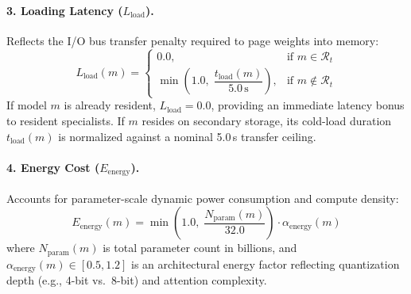 \paragraph{3. Loading Latency ($L_{\text{load}}$).}
Reflects the I/O bus transfer penalty required to page weights into memory:
\begin{equation}
L_{\text{load}}(m) = \begin{cases}
0.0, & \text{if } m \in \mathcal{R}_t \\
\min\left(1.0, \;\dfrac{t_{\text{load}}(m)}{5.0\,\text{s}}\right), & \text{if } m \notin \mathcal{R}_t
\end{cases}
\end{equation}
If model $m$ is already resident, $L_{\text{load}} = 0.0$, providing an immediate latency bonus to resident specialists. If $m$ resides on secondary storage, its cold-load duration $t_{\text{load}}(m)$ is normalized against a nominal 5.0\,s transfer ceiling.

\paragraph{4. Energy Cost ($E_{\text{energy}}$).}
Accounts for parameter-scale dynamic power consumption and compute density:
\begin{equation}
E_{\text{energy}}(m) = \min\left(1.0, \;\frac{N_{\text{param}}(m)}{32.0}\right) \cdot \alpha_{\text{energy}}(m)
\end{equation}
where $N_{\text{param}}(m)$ is total parameter count in billions, and $\alpha_{\text{energy}}(m) \in [0.5, 1.2]$ is an architectural energy factor reflecting quantization depth (e.g., 4-bit vs.\ 8-bit) and attention complexity.

